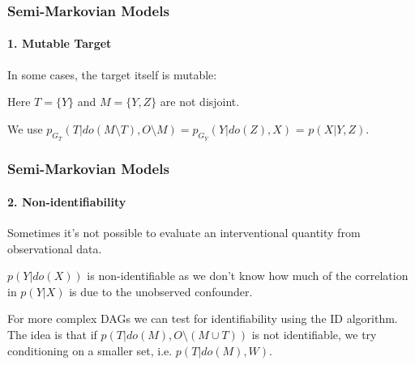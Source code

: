 \documentclass{beamer}
\begin{document}
\begin{frame}
\frametitle{Semi-Markovian Models}
\framesubtitle{1. Mutable Target}

In some cases, the target itself is mutable:

Here $T = \{Y\}$ and $M = \{Y, Z\}$ are not disjoint.
\medskip

\pause
We use $p_{G_{\bar{T}}}(T|do(M\setminus T), O\setminus M) = p_{G_{\bar{Y}}}(Y|do(Z), X)$ = $p(X|Y, Z)$.
\end{frame}


\begin{frame}
\frametitle{Semi-Markovian Models}
\framesubtitle{2. Non-identifiability}
Sometimes it's not possible to evaluate an interventional quantity from observational data.

\begin{center}
\end{center}

$p(Y|do(X))$ is non-identifiable as we don't know how much of the correlation in $p(Y|X)$ is due to the unobserved confounder.

\medskip
For more complex DAGs we can test for identifiability using the ID algorithm. The idea is that if $p(T|do(M), O\setminus(M \cup T))$ is not identifiable, we try conditioning on a smaller set, i.e. $p(T|do(M), W)$.
\end{frame}
\end{document}
